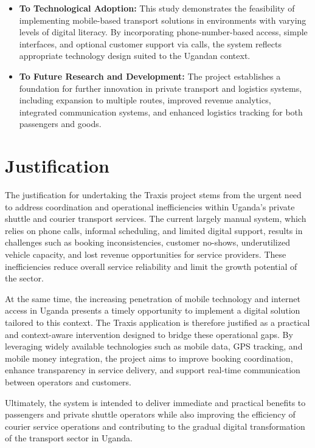 \begin{itemize}
 \item \textbf{To Technological Adoption:} This study demonstrates the
        feasibility of implementing mobile-based transport solutions in
        environments with varying levels of digital literacy. By incorporating
        phone-number-based access, simple interfaces, and optional customer
        support via calls, the system reflects appropriate technology design
        suited to the Ugandan context.

 \item \textbf{To Future Research and Development:} The project
        establishes a foundation for further innovation in private transport and
        logistics systems, including expansion to multiple routes, improved
        revenue analytics, integrated communication systems, and enhanced
        logistics tracking for both passengers and goods.
\end{itemize}
\section{Justification}
The justification for undertaking the Traxis project stems from the urgent need
to address coordination and operational inefficiencies within Uganda’s private
shuttle and courier transport services. The current largely manual system, which
relies on phone calls, informal scheduling, and limited digital support, results
in challenges such as booking inconsistencies, customer no-shows, underutilized
vehicle capacity, and lost revenue opportunities for service providers. These
inefficiencies reduce overall service reliability and limit the growth potential
of the sector.


At the same time, the increasing penetration of mobile technology and internet
access in Uganda presents a timely opportunity to implement a digital solution
tailored to this context. The Traxis application is therefore justified as a
practical and context-aware intervention designed to bridge these operational
gaps. By leveraging widely available technologies such as mobile data, GPS
tracking, and mobile money integration, the project aims to improve booking
coordination, enhance transparency in service delivery, and support real-time
communication between operators and customers.


Ultimately, the system is intended to deliver immediate and practical benefits
to passengers and private shuttle operators while also improving the efficiency
of courier service operations and contributing to the gradual digital
transformation of the transport sector in Uganda.
